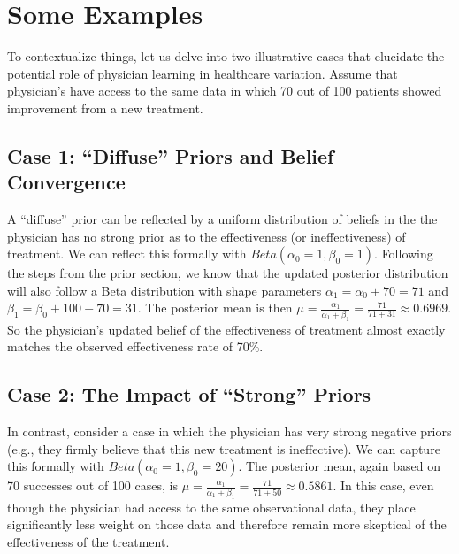 \documentclass[
  letterpaper,
  DIV=11,
  numbers=noendperiod]{scrreport}
\theoremstyle{definition}
\theoremstyle{remark}
\begin{document}
\hypertarget{some-examples}{%
\section{Some Examples}\label{some-examples}}

To contextualize things, let us delve into two illustrative cases that
elucidate the potential role of physician learning in healthcare
variation. Assume that physician's have access to the same data in which
70 out of 100 patients showed improvement from a new treatment.

\hypertarget{case-1-diffuse-priors-and-belief-convergence}{%
\subsection{Case 1: ``Diffuse'' Priors and Belief
Convergence}\label{case-1-diffuse-priors-and-belief-convergence}}

A ``diffuse'' prior can be reflected by a uniform distribution of
beliefs in the the physician has no strong prior as to the effectiveness
(or ineffectiveness) of treatment. We can reflect this formally with
\(Beta(\alpha_{0}=1, \beta_{0}=1)\). Following the steps from the prior
section, we know that the updated posterior distribution will also
follow a Beta distribution with shape parameters
\(\alpha_{1} = \alpha_{0} + 70 = 71\) and
\(\beta_{1} = \beta_{0} + 100 - 70 = 31\). The posterior mean is then
\(\mu = \frac{\alpha_{1}}{\alpha_{1}+\beta_{1}} = \frac{71}{71+31} \approx 0.6969\).
So the physician's updated belief of the effectiveness of treatment
almost exactly matches the observed effectiveness rate of 70\%.

\hypertarget{case-2-the-impact-of-strong-priors}{%
\subsection{Case 2: The Impact of ``Strong''
Priors}\label{case-2-the-impact-of-strong-priors}}

In contrast, consider a case in which the physician has very strong
negative priors (e.g., they firmly believe that this new treatment is
ineffective). We can capture this formally with
\(Beta(\alpha_{0}=1, \beta_{0}=20)\). The posterior mean, again based on
70 successes out of 100 cases, is
\(\mu = \frac{\alpha_{1}}{\alpha_{1}+\beta_{1}} = \frac{71}{71+50} \approx 0.5861\).
In this case, even though the physician had access to the same
observational data, they place significantly less weight on those data
and therefore remain more skeptical of the effectiveness of the
treatment.
\end{document}
